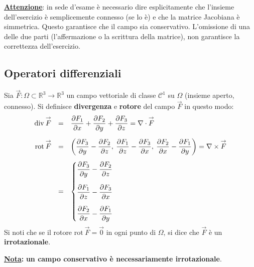 \documentclass[a4paper]{article}
\newcommand{\definition}[1]{\textcolor{Red3}{\textbf{#1}}}
\begin{document}
	\noindent
	\underline{\textbf{Attenzione}}: in sede d'esame è necessario dire esplicitamente che l'insieme dell'esercizio è semplicemente connesso (se lo è) e che la matrice Jacobiana è simmetrica. Questo garantisce che il campo sia conservativo. L'omissione di una delle due parti (l'affermazione o la scrittura della matrice), non garantisce la correttezza dell'esercizio.\newpage

	\subsection{Operatori differenziali}

	Sia $\overset{\rightarrow}{F} : \Omega \subset \mathbb{R}^{3} \rightarrow \mathbb{R}^{3}$ un campo vettoriale di classe $\mathcal{C}^{1}$ su $\Omega$ (insieme aperto, connesso). Si definisce \definition{divergenza} e \definition{rotore} del campo $\overset{\rightarrow}{F}$ in questo modo:
	\begin{equation}
		\begin{array}{rcl}
			\mathrm{div} \:\overset{\rightarrow}{F}
			&=&
			\dfrac{\partial F_{1}}{\partial x} + \dfrac{\partial F_{2}}{\partial y} + \dfrac{\partial F_{3}}{\partial z} = \nabla \cdot \overset{\rightarrow}{F} \\ [1.5em]
			\mathrm{rot} \:\overset{\rightarrow}{F}
			&=&
			\left(\dfrac{\partial F_{3}}{\partial y} - \dfrac{\partial F_{2}}{\partial z}, \: \dfrac{\partial F_{1}}{\partial z} - \dfrac{\partial F_{3}}{\partial x}, \: \dfrac{\partial F_{2}}{\partial x} - \dfrac{\partial F_{1}}{\partial y}\right) = \nabla \times \overset{\rightarrow}{F} \\ [1.5em]
			&=&
			\begin{cases}
				\dfrac{\partial F_{3}}{\partial y} - \dfrac{\partial F_{2}}{\partial z} \vspace{1em} \\
				\dfrac{\partial F_{1}}{\partial z} - \dfrac{\partial F_{3}}{\partial x} \vspace{1em} \\
				\dfrac{\partial F_{2}}{\partial x} - \dfrac{\partial F_{1}}{\partial y}
			\end{cases}
		\end{array}
	\end{equation}
	Si noti che se il rotore $\mathrm{rot} \:\overset{\rightarrow}{F} = \overset{\rightarrow}{0}$ in ogni punto di $\Omega$, si dice che $\overset{\rightarrow}{F}$ è un \definition{irrotazionale}.

	\noindent
	\textbf{\underline{Nota}:} \textbf{un campo conservativo è necessariamente irrotazionale}.\newline
\end{document}
